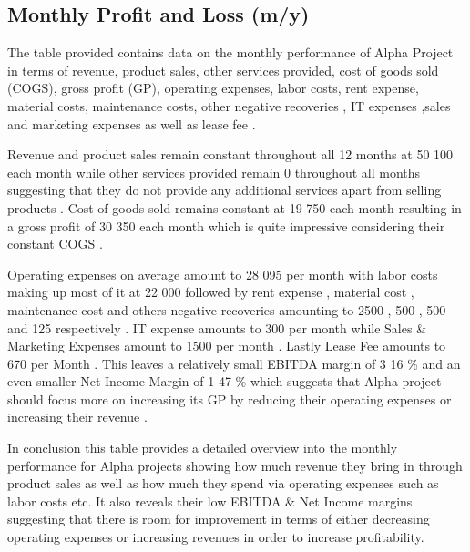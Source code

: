 

\subsection{Monthly Profit and Loss (m/y)}\label{sec:title}

The table provided contains data on the monthly performance of Alpha Project in terms of revenue, product sales, other services provided, cost of goods sold (COGS), gross profit (GP), operating expenses, labor costs, rent expense, material costs, maintenance costs, other negative recoveries , IT expenses ,sales and marketing expenses as well as lease fee . 

Revenue and product sales remain constant throughout all 12 months at 50 100 each month while other services provided remain 0 throughout all months suggesting that they do not provide any additional services apart from selling products . Cost of goods sold remains constant at 19 750 each month resulting in a gross profit of 30 350 each month which is quite impressive considering their constant COGS . 

Operating expenses on average amount to 28 095 per month with labor costs making up most of it at 22 000 followed by rent expense , material cost , maintenance cost and others negative recoveries amounting to 2500 , 500 , 500  and 125 respectively . IT expense amounts to 300 per month while Sales & Marketing Expenses amount to 1500 per month . Lastly Lease Fee amounts to 670 per Month . This leaves a relatively small EBITDA margin of 3 16 \%   and an even smaller Net Income Margin of 1 47 \% which suggests that Alpha project should focus more on increasing its GP by reducing their operating expenses or increasing their revenue . 

 In conclusion this table provides a detailed overview into the monthly performance for Alpha projects showing how much revenue they bring in through product sales as well as how much they spend via operating expenses such as labor costs etc. It also reveals their low EBITDA & Net Income margins suggesting that there is room for improvement in terms of either decreasing operating expenses or increasing revenues in order to increase profitability.